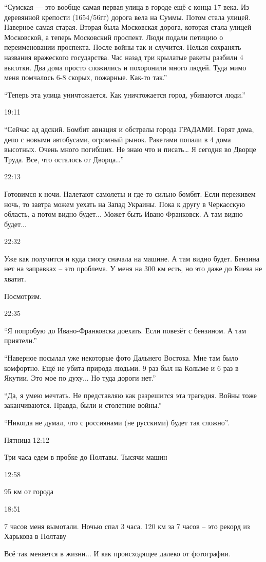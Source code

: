 \enquote{Сумская — это вообще самая первая улица в городе ещё с конца 17 века. Из
деревянной крепости (1654/56гг) дорога вела на Суммы. Потом стала улицей.
Наверное самая старая. Вторая была Московская дорога, которая стала улицей
Московской, а теперь Московский проспект. Люди подали петицию о переименовании
проспекта. После войны так и случится. Нельзя сохранять названия вражеского
государства. Час назад три крылатые ракеты разбили 4 высотки. Два дома просто
сложились и похоронили много людей. Туда мимо меня помчалось 6-8 скорых,
пожарные. Как-то так.}

\enquote{Теперь эта улица уничтожается. Как уничтожается город, убиваются люди.}

19:11

\enquote{Сейчас ад адский. Бомбит авиация и обстрелы города ГРАДАМИ. Горят дома, депо с
новыми автобусами, огромный рынок. Ракетами попали в 4 дома высотных. Очень
много погибших. Не знаю что и писать… Я сегодня во Дворце Труда. Все, что
осталось от Дворца…}

22:13

Готовимся к ночи. Налетают самолеты и где-то сильно бомбят. Если переживем
ночь, то завтра можем уехать на Запад Украины. Пока к другу в Черкасскую
область, а потом видно будет... Может быть Ивано-Франковск. А там видно будет...

22:32

Уже как получится и куда смогу сначала на машине. А там видно будет. Бензина
нет на заправках – это проблема. У меня на 300 км есть, но это даже до Киева не
хватит.

Посмотрим.

22:35

\enquote{Я попробую до Ивано-Франковска доехать. Если повезёт с бензином. А там приятели.}

\enquote{Наверное посылал уже некоторые фото Дальнего Востока. Мне там было комфортно.
Ещё не убита природа людьми. 9 раз был на Колыме и 6 раз в Якутии. Это мое по
духу... Но туда дороги нет.}

\enquote{Да, я умею мечтать. Не представляю как разрешится эта трагедия. Войны
тоже заканчиваются. Правда, были и столетние войны.}

\enquote{Никогда не думал, что с россиянами (не русскими) будет так сложно}.

Пятница 12:12

Три часа едем в пробке до Полтавы. Тысячи машин

12:58

95 км от города

18:51

7 часов меня вымотали. Ночью спал 3 часа. 120 км за 7 часов – это рекорд из
Харькова в Полтаву

Всё так меняется в жизни... И как происходящее далеко от фотографии.

